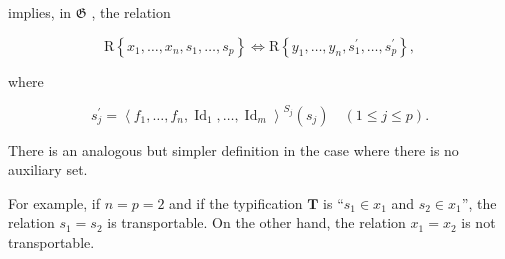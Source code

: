 implies, in \(\mathfrak{G}\) , the relation

\[
\mathrm{R} \left\{x _ {1}, \dots , x _ {n}, s _ {1}, \dots , s _ {p} \right\} \Longleftrightarrow \mathrm{R} \left\{y _ {1}, \dots , y _ {n}, s _ {1} ^ {\prime}, \dots , s _ {p} ^ {\prime} \right\},\tag{2}
\]

where

\[
s _ {j} ^ {\prime} = \left\langle f _ {1}, \dots , f _ {n}, \operatorname{Id} _ {1}, \dots , \operatorname{Id} _ {m} \right\rangle^ {S_j} (s _ {j}) \quad (1 \leqslant j \leqslant p).\tag{3}
\]

There is an analogous but simpler definition in the case where there is no auxiliary set.

For example, if \(n = p = 2\) and if the typification \(\mathbf{T}\) is ``\(s_1 \in x_1\) and \(s_2 \in x_1\)'', the relation \(s_1 = s_2\) is transportable. On the other hand, the relation \(x_1 = x_2\) is not transportable.

